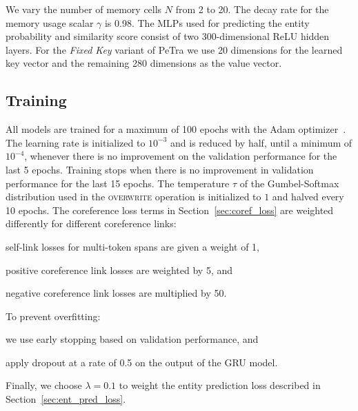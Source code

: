 \documentclass[12pt]{thesis-umich}[thesis]
\newcommand{\actoverwrite}{\textsc{overwrite}\xspace}
\begin{document}
We vary the number of memory cells $N$
from 2 to 20. The decay rate for the memory usage scalar $\gamma$ is 0.98. The MLPs used for predicting the entity probability and similarity score consist of two 300-dimensional ReLU hidden layers.
For the \emph{Fixed Key} variant of PeTra we use 20 dimensions for the learned key vector and the remaining 280 dimensions as the value vector.




\subsection{Training}
All models are trained for a maximum of 100 epochs with the Adam optimizer~\cite{Kingma2015AdamAM}.
The learning rate is initialized to $10^{-3}$
and is reduced by half, until a minimum of $10^{-4}$,
whenever there is no improvement on the validation performance for the last 5 epochs.
Training stops when there is no improvement in validation performance for the last 15 epochs.
The temperature $\tau$ of the Gumbel-Softmax distribution used in the \actoverwrite operation is initialized to $1$ and halved every 10 epochs.
The coreference loss terms in Section~\ref{sec:coref_loss} are weighted differently for different coreference links: \begin{enumerate*}[label=(\alph*)]
    \item self-link losses for multi-token spans are given a weight of 1,
    \item positive coreference link losses are weighted by 5, and
    \item negative coreference link losses are multiplied by 50.
\end{enumerate*}
To prevent overfitting: \begin{enumerate*}[label=(\alph*)]
    \item we use early stopping based on validation performance, and
    \item apply dropout at a rate of 0.5 on the output of the GRU model.
\end{enumerate*}
Finally, we choose $\lambda=0.1$ to weight the entity prediction loss described in Section~\ref{sec:ent_pred_loss}.
\end{document}
